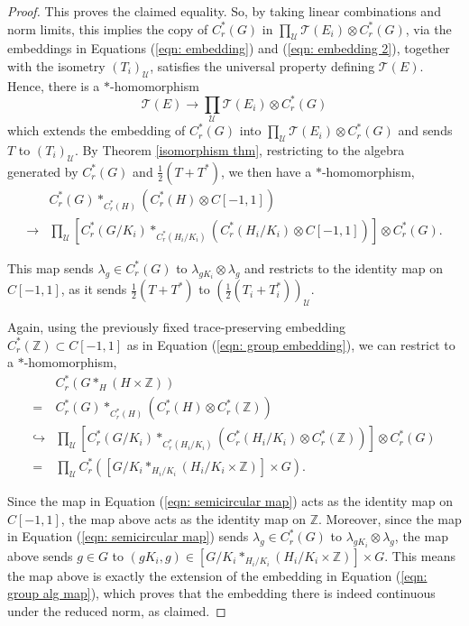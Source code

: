 \documentclass[10pt]{amsart}
\theoremstyle{definition}
\newcommand{\Z}{\ensuremath{\mathbb{Z}}}
\newcommand{\cU}{\ensuremath{\mathcal{U}}}
\newcommand{\cT}{\ensuremath{\mathcal{T}}}
\begin{document}
\begin{proof}
    This proves the claimed equality. So, by taking linear combinations and norm limits, this implies the copy of $C_r^\ast(G)$ in $\prod_\cU \cT(E_i) \otimes C_r^\ast(G)$, via the embeddings in Equations (\ref{eqn: embedding}) and (\ref{eqn: embedding 2}), together with the isometry $(T_i)_\cU$, satisfies the universal property defining $\cT(E)$. Hence, there is a $\ast$-homomorphism
    \begin{equation*}
        \cT(E) \to \prod_\cU \cT(E_i) \otimes C_r^*(G)
    \end{equation*}
    which extends the embedding of $C_r^\ast(G)$ into $\prod_\cU \cT(E_i) \otimes C_r^\ast(G)$ and sends $T$ to $(T_i)_\cU$. By Theorem \ref{isomorphism thm}, restricting to the algebra generated by $C_r^\ast(G)$ and $\frac{1}{2}(T + T^\ast)$, we then have a $\ast$-homomorphism,
    \begin{equation}\label{eqn: semicircular map}
    \begin{split}
        &C_r^\ast(G) \ast_{C_r^\ast(H)} (C_r^\ast(H) \otimes C[-1,1])\\
        \to &\prod_\cU [C_r^\ast(G/K_i) \ast_{C_r^\ast(H_i/K_i)} (C_r^\ast(H_i/K_i) \otimes C[-1,1])] \otimes C_r^\ast(G).
    \end{split}
    \end{equation}

    This map sends $\lambda_g \in C_r^\ast(G)$ to $\lambda_{gK_i} \otimes \lambda_g$ and restricts to the identity map on $C[-1, 1]$, as it sends $\frac{1}{2}(T + T^\ast)$ to $\left(\frac{1}{2}(T_i + T_i^\ast)\right)_\cU$.

    Again, using the previously fixed trace-preserving embedding $C_r^\ast(\Z) \subset C[-1, 1]$ as in Equation (\ref{eqn: group embedding}), we can restrict to a $\ast$-homomorphism,
    \begin{equation*}
    \begin{split}
        &C_r^\ast(G \ast_H (H \times \Z))\\
        = &C_r^\ast(G) \ast_{C_r^\ast(H)} (C_r^\ast(H) \otimes C_r^\ast(\Z))\\
        \hookrightarrow &\prod_\cU [C_r^\ast(G/K_i) \ast_{C_r^\ast(H_i/K_i)} (C_r^\ast(H_i/K_i) \otimes C_r^\ast(\Z))] \otimes C_r^\ast(G)\\
        = &\prod_\cU C_r^\ast([G/K_i \ast_{H_i/K_i} (H_i/K_i \times \Z)] \times G).
    \end{split}
    \end{equation*}

    Since the map in Equation (\ref{eqn: semicircular map}) acts as the identity map on $C[-1, 1]$, the map above acts as the identity map on $\Z$. Moreover, since the map in Equation (\ref{eqn: semicircular map}) sends $\lambda_g \in C_r^\ast(G)$ to $\lambda_{gK_i} \otimes \lambda_g$, the map above sends $g \in G$ to $(gK_i, g) \in [G/K_i \ast_{H_i/K_i} (H_i/K_i \times \Z)] \times G$. This means the map above is exactly the extension of the embedding in Equation (\ref{eqn: group alg map}), which proves that the embedding there is indeed continuous under the reduced norm, as claimed.
\end{proof}
\end{document}

